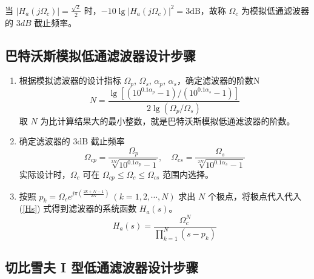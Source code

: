\documentclass[12pt,AutoFakeBold]{article}
\begin{document}
当 $|H_a(j\Omega_c)|=\frac{\sqrt{2}}{2}$ 时，$-10\lg|H_a(j\Omega_c)|^2=3\mathrm{dB}$，故称 $\Omega_c$ 为模拟低通滤波器的 $3dB$ 截止频率。

\subsection{巴特沃斯模拟低通滤波器设计步骤}

\begin{enumerate}[1.]
\item 根据模拟滤波器的设计指标 $\Omega_p$, $\Omega_s$, $\alpha_p$, $\alpha_s$，确定滤波器的阶数N
\begin{equation}
N=\frac{\lg[(10^{0.1\alpha_p}-1)/(10^{0.1\alpha_s}-1)]}{2\lg(\Omega_p/\Omega_s)}
\end{equation}
取 $N$ 为比计算结果大的最小整数，就是巴特沃斯模拟低通滤波器的阶数。

\item 确定滤波器的 $3\mathrm{dB}$ 截止频率
\begin{equation}
\Omega_{cp}=\frac{\Omega_p}{\sqrt[2N]{10^{0.1\alpha_p}-1}},\quad
\Omega_{cs}=\frac{\Omega_s}{\sqrt[2N]{10^{0.1\alpha_s}-1}}
\end{equation}
实际设计时，$\Omega_c$ 可在 $\Omega_{cp}\le\Omega_c\le\Omega_{cs}$ 范围内选择。

\item 按照 $p_k=\displaystyle\Omega_ce^{j\pi\left(\frac{2k+N-1}{2N}\right)}\ (k=1,2,\cdots,N)$ 求出 $N$ 个极点，将极点代入代入 (\ref{Hs}) 式得到滤波器的系统函数 $H_a(s)$。
\begin{equation}
H_a(s)=\frac{\Omega_c^N}{\displaystyle\prod_{k=1}^N(s-p_k)} \label{Hs}
\end{equation}
\end{enumerate}

\subsection{切比雪夫 I 型低通滤波器设计步骤}
\end{document}
